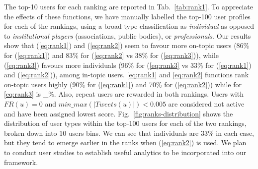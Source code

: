 The top-10 users for each ranking are reported in Tab.~\ref{tab:rank1}. To appreciate the effects of these functions, we have manually labelled the top-100 user profiles for each of the rankings, using a broad type classification as \textit{individual} as opposed to \textit{institutional players} (associations, public bodies), or \textit{professionals}. 
Our results show that (\ref{eq:rank1}) and (\ref{eq:rank2}) seem to favour more on-topic users (86\% for (\ref{eq:rank1}) and 83\% for (\ref{eq:rank2} vs 38\% for (\ref{eq:rank3})), 
while (\ref{eq:rank3}) favours more individuals (96\% for (\ref{eq:rank3} vs 33\% for (\ref{eq:rank1}) and (\ref{eq:rank2})), among in-topic users.
%
\ref{eq:rank1} and \ref{eq:rank2} functions rank on-topic users highly (90\% for (\ref{eq:rank1}) and 70\% for (\ref{eq:rank2})) while for \ref{eq:rank3} is \_\%.
Also, repeat users are rewarded in both rankings. Users with $\mathit{FR}(u) = 0$ and $\mathit{min\_max(\lvert Tweets (u)\rvert) < 0.005}$ are considered not active and have been assigned lowest score.
Fig.~\ref{fig:ranks-distribution} shows the distribution of user types within the top-100 users for each of the two rankings, broken down into 10 users bins. We can see that individuals are 33\% in each case, but they tend to emerge earlier in the ranks when (\ref{eq:rank2}) is used.
We plan to conduct user studies to establish useful analytics to be incorporated into our framework. 
